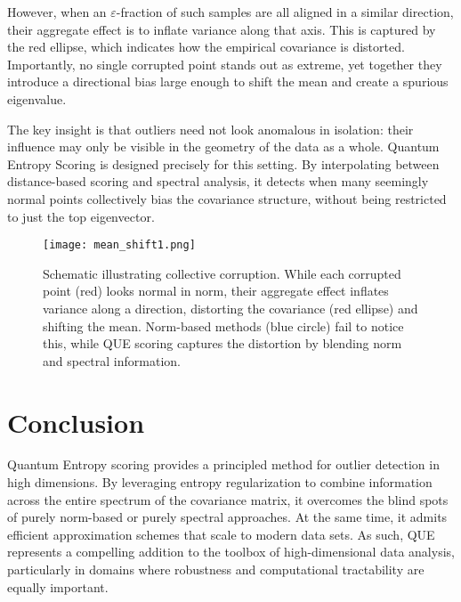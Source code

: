 \documentclass[11pt]{article}
\begin{document}
However, when an $\varepsilon$-fraction of such samples are all aligned in a similar direction, their aggregate effect is to inflate variance along that axis. This is captured by the red ellipse, which indicates how the empirical covariance is distorted. Importantly, no single corrupted point stands out as extreme, yet together they introduce a directional bias large enough to shift the mean and create a spurious eigenvalue.

The key insight is that outliers need not look anomalous in isolation: their influence may only be visible in the geometry of the data as a whole. Quantum Entropy Scoring is designed precisely for this setting. By interpolating between distance-based scoring and spectral analysis, it detects when many seemingly normal points collectively bias the covariance structure, without being restricted to just the top eigenvector.

\begin{figure}[h!]
    \centering
    \texttt{[image: mean\_shift1.png]}
    \caption{Schematic illustrating collective corruption. While each corrupted point (red) looks normal in norm, their aggregate effect inflates variance along a direction, distorting the covariance (red ellipse) and shifting the mean. Norm-based methods (blue circle) fail to notice this, while QUE scoring captures the distortion by blending norm and spectral information.}
    \label{fig:que-example}
\end{figure}

\section{Conclusion}
Quantum Entropy scoring provides a principled method for outlier detection in high dimensions. By leveraging entropy regularization to combine information across the entire spectrum of the covariance matrix, it overcomes the blind spots of purely norm-based or purely spectral approaches. At the same time, it admits efficient approximation schemes that scale to modern data sets. As such, QUE represents a compelling addition to the toolbox of high-dimensional data analysis, particularly in domains where robustness and computational tractability are equally important.
\end{document}
